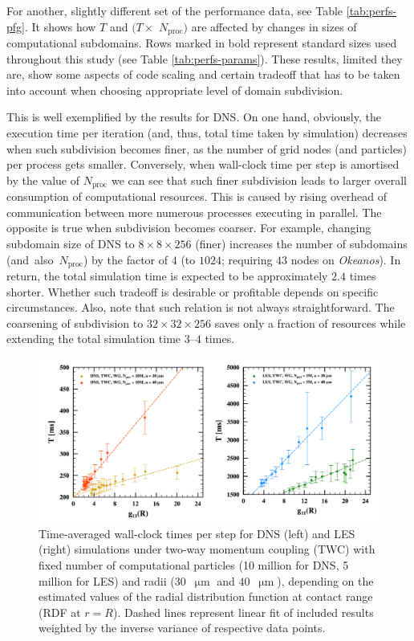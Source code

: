 \documentclass{pracamgren}
\begin{document}
For another, slightly different set of the performance data, see Table \ref{tab:perfs-pfg}.
It shows how $T$ and $(T \times$ $N_{\text{proc}})$ are affected by changes in sizes of computational subdomains.
Rows marked in bold represent standard sizes used throughout this study (see Table \ref{tab:perfs-params}).
These results, limited they are, show some aspects of code scaling and certain tradeoff that has to be taken into account when choosing appropriate level of domain subdivision.

This is well exemplified by the results for DNS.
On one hand, obviously, the execution time per iteration (and, thus, total time taken by simulation) decreases when such subdivision becomes finer, as the number of grid nodes (and particles) per process gets smaller.
Conversely, when wall-clock time per step is amortised by the value of $N_{\text{proc}}$ we can see that such finer subdivision leads to larger overall consumption of computational resources.
This is caused by rising overhead of communication between more numerous processes executing in parallel.
The opposite is true when subdivision becomes coarser.
For example, changing subdomain size of DNS to $8 \times 8 \times 256$ (finer) increases the number of subdomains (and~also~$N_{\text{proc}}$) by the factor of $4$ (to $1024$; requiring $43$ nodes on \emph{Okeanos}).
In return, the total simulation time is expected to be approximately $2.4$ times shorter.
Whether such tradeoff is desirable or profitable depends on specific circumstances.
Also, note that such relation is not always straightforward.
The coarsening of subdivision to $32 \times 32 \times 256$ saves only a fraction of resources while extending the total simulation time $3$--$4$ times.

\medskip

\begin{figure}[ht]
\centering
\includegraphics[width=13.5cm]{figures/3-05_pfsrdf.pdf}
\caption{
Time-averaged wall-clock times per step for DNS (left) and LES (right) simulations under two-way momentum coupling (TWC) with fixed number of computational particles (10 million for DNS, 5 million for LES) and radii ($30$~$\upmu\text{m}$ and $40$~$\upmu\text{m}$), depending on the estimated values of the radial distribution function at contact range (RDF at $r=R$).
Dashed lines represent linear fit of included results weighted by the inverse variance of respective data points.
}
\label{fig:pfsrdf}
\end{figure}
\end{document}
